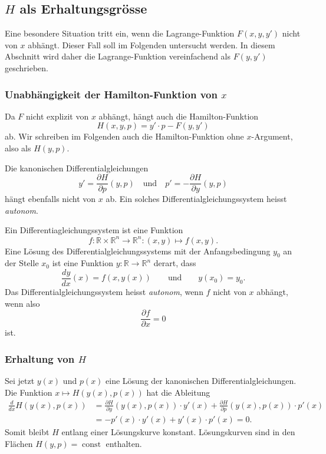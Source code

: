%
%
\subsection{$H$ als Erhaltungsgrösse}
Eine besondere Situation tritt ein, wenn die Lagrange-Funktion $F(x,y,y')$
nicht von $x$ abhängt.
Dieser Fall soll im Folgenden untersucht werden.
In diesem Abschnitt wird daher die
Lagrange-Funktion vereinfachend als $F(y,y')$ geschrieben.

%
%
\subsubsection{Unabhängigkeit der Hamilton-Funktion von $x$}
Da $F$ nicht explizit von $x$ abhängt, hängt auch die
Hamilton-Funktion
\[
H(x,y,p)
=
y'\cdot p - F(y,y')
\]
ab.
Wir schreiben im Folgenden auch die Hamilton-Funktion ohne $x$-Argument,
also als $H(y,p)$.

Die kanonischen Differentialgleichungen
\[
y' = \frac{\partial H}{\partial p}(y,p)
\quad\text{und}\quad
p' = -\frac{\partial H}{\partial y}(y,p)
\]
hängt ebenfalls nicht von $x$ ab.
Ein solches Differentialgleichungssystem heisst {\em autonom}.

\begin{definition}
Ein Differentiagleichungssystem ist eine Funktion 
\[
f\colon \mathbb{R}\times \mathbb{R}^n\to\mathbb{R}^n
:
(x,y)\mapsto f(x,y).
\]
Eine Lösung des Differentialgleichungssystems mit der Anfangsbedingung
$y_0$ an der Stelle $x_0$ ist eine Funktion
$y\colon\mathbb{R}\to\mathbb{R}^n$ derart, dass 
\[
\frac{dy}{dx}(x)
=
f(x,y(x))
\qquad\text{und}\qquad
y(x_0)=y_0.
\]
Das Differentialgleichungssystem heisst {\em autonom}, wenn $f$ nicht von
%
$x$ abhängt, wenn also
\[
\frac{\partial f}{\partial x} = 0
\]
ist.
\end{definition}

%
%
\subsubsection{Erhaltung von $H$}
Sei jetzt $y(x)$ und $p(x)$ eine Lösung der kanonischen
Differentialgleichungen.
Die Funktion $x\mapsto H(y(x),p(x))$ hat die Ableitung
\begin{align*}
\frac{d}{dx}H(y(x),p(x))
&=
\frac{\partial H}{\partial y}(y(x),p(x))\cdot y'(x)
+
\frac{\partial H}{\partial p}(y(x),p(x))\cdot p'(x)
\\
&=
-p'(x)\cdot y'(x)
+
y'(x)\cdot p'(x)
=
0.
\end{align*}
Somit bleibt $H$ entlang einer Lösungskurve konstant.
Lösungskurven sind in den Flächen $H(y,p)=\operatorname{const}$
enthalten.

